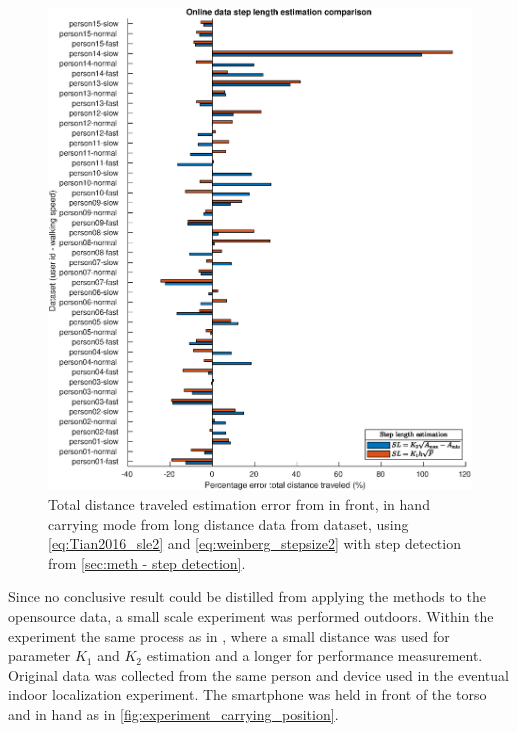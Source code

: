 \begin{figure}[H]
	\centering
	\includegraphics[width=\linewidth]{images/20201128_1403_Online_data_step_length_estimation_comparison}
	\caption{Total distance traveled estimation error from in front, in hand carrying mode from long distance data from \citet{Vezocnik2019} dataset, using \eqref{eq:Tian2016_sle2} and \eqref{eq:weinberg_stepsize2} with step detection from \cref{sec:meth - step detection}. }
	\label{fig:202011131943_wienberg_vs_tian_vezocnik_data1}
\end{figure}
 
Since no conclusive result could be distilled from applying the methods to the opensource data, a small scale experiment was performed outdoors. Within the experiment the same process as in \cite{Vezocnik2019}, where a small distance was used for parameter $ K_1 $ and $ K_2 $ estimation and a longer for performance measurement. Original data was collected from the same person and device used in the eventual indoor localization experiment. The smartphone was held in front of the torso and in hand as in \cref{fig:experiment_carrying_position}. \par 

